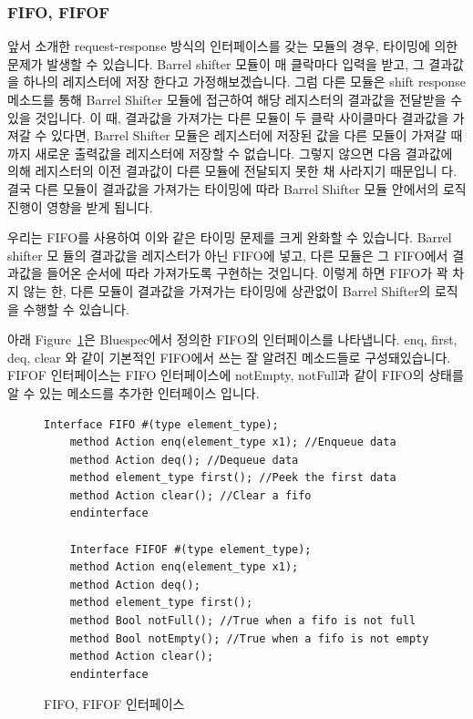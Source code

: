 \documentclass{article}
\begin{document}
\subsubsection{FIFO, FIFOF}
앞서 소개한 request-response 방식의 인터페이스를 갖는 모듈의 경우, 타이밍에 의한 문제가 발생할
수 있습니다. Barrel shifter 모듈이 매 클락마다 입력을 받고, 그 결과값을 하나의 레지스터에 저장
한다고 가정해보겠습니다. 그럼 다른 모듈은 shift response메소드를 통해 Barrel Shifter 모듈에
접근하여 해당 레지스터의 결과값을 전달받을 수 있을 것입니다. 이 때, 결과값을 가져가는 다른
모듈이 두 클락 사이클마다 결과값을 가져갈 수 있다면, Barrel Shifter 모듈은 레지스터에 저장된
값을 다른 모듈이 가져갈 때까지 새로운 출력값을 레지스터에 저장할 수 없습니다. 그렇지 않으면
다음 결과값에 의해 레지스터의 이전 결과값이 다른 모듈에 전달되지 못한 채 사라지기 때문입니
다. 결국 다른 모듈이 결과값을 가져가는 타이밍에 따라 Barrel Shifter 모듈 안에서의 로직 진행이
영향을 받게 됩니다.

우리는 FIFO를 사용하여 이와 같은 타이밍 문제를 크게 완화할 수 있습니다. Barrel shifter 모
듈의 결과값을 레지스터가 아닌 FIFO에 넣고, 다른 모듈은 그 FIFO에서 결과값을 들어온 순서에
따라 가져가도록 구현하는 것입니다. 이렇게 하면 FIFO가 꽉 차지 않는 한, 다른 모듈이 결과값을
가져가는 타이밍에 상관없이 Barrel Shifter의 로직을 수행할 수 있습니다.

아래 Figure~\ref{fig:fifo_interface}은 Bluespec에서 정의한 FIFO의 인터페이스를 나타냅니다. enq, first, deq, clear
와 같이 기본적인 FIFO에서 쓰는 잘 알려진 메소드들로 구성돼있습니다. FIFOF 인터페이스는 FIFO
인터페이스에 notEmpty, notFull과 같이 FIFO의 상태를 알 수 있는 메소드를 추가한 인터페이스
입니다.

\begin{figure}[!ht]
	\centering
\begin{Verbatim}[frame=single]
	Interface FIFO #(type element_type);
	method Action enq(element_type x1); //Enqueue data
	method Action deq(); //Dequeue data
	method element_type first(); //Peek the first data
	method Action clear(); //Clear a fifo
	endinterface
	
	Interface FIFOF #(type element_type);
	method Action enq(element_type x1);
	method Action deq();
	method element_type first();
	method Bool notFull(); //True when a fifo is not full
	method Bool notEmpty(); //True when a fifo is not empty
	method Action clear();
	endinterface
\end{Verbatim}
	\caption{FIFO, FIFOF 인터페이스}
	\label{fig:fifo_interface}
\end{figure}
\end{document}
